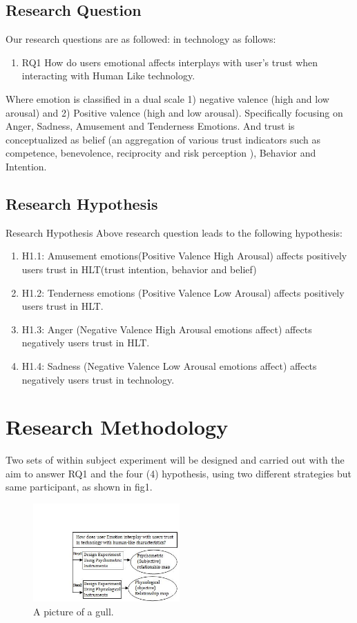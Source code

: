 \subsection{Research Question }
Our research questions are as followed:
in technology as follows:
\begin{enumerate}
   \item RQ1 How do users emotional affects interplays with 
    user’s trust when interacting with Human Like technology.
\end{enumerate}

Where emotion is classified in a dual scale 1) negative valence (high and low arousal) and 2) Positive valence (high and low arousal). Specifically focusing on  Anger, Sadness, Amusement and Tenderness Emotions. And trust is conceptualized as  belief (an aggregation of various trust indicators such as competence, benevolence, reciprocity and risk perception ), Behavior and Intention. 
\subsection{Research Hypothesis}
Research Hypothesis
Above research question leads to the following hypothesis:
\begin{enumerate}
    \item H1.1: Amusement emotions(Positive  Valence High Arousal) affects positively users trust in HLT(trust intention, behavior  and belief)
	\item H1.2: Tenderness emotions  (Positive Valence Low Arousal) affects positively users trust in HLT.
	\item H1.3: Anger (Negative Valence High Arousal emotions affect) affects  negatively users trust in HLT.
	\item H1.4: Sadness (Negative Valence  Low Arousal emotions affect) affects negatively users trust in technology.
\end{enumerate}
\section{Research Methodology}
Two sets of within subject experiment will be designed and carried out with the aim to answer RQ1 and the four (4) hypothesis, using two different strategies but same participant, as shown in fig1.

\begin{figure}[h]
   \includegraphics[width=0.5\textwidth]{maps}
    \caption{A picture of a gull.}
\end{figure}


